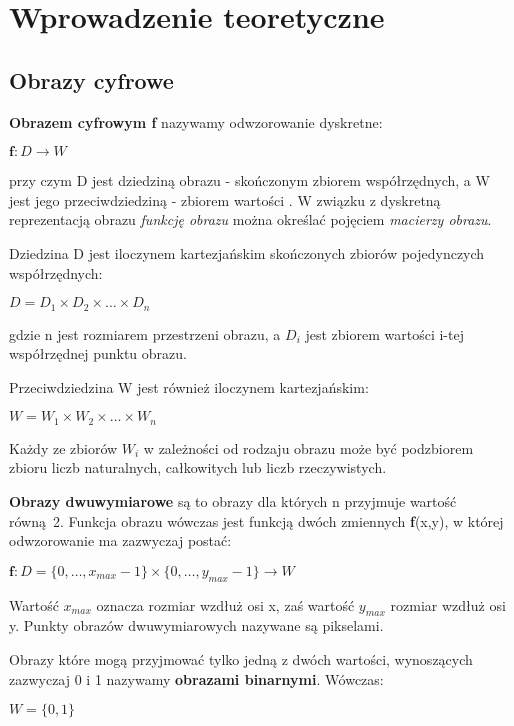 \documentclass[a4paper,12pt,twoside,openany]{report}
\begin{document}
\chapter{Wprowadzenie teoretyczne}
\section{Obrazy cyfrowe}
\textbf{Obrazem cyfrowym f} nazywamy odwzorowanie dyskretne: 
\begin{center}
	$ \textbf{f} \colon D \to W $ 
\end{center}
przy czym D jest dziedziną obrazu - skończonym zbiorem współrzędnych, a W jest jego przeciwdziedziną - zbiorem wartości \cite{Iwanowski}. W związku z dyskretną reprezentacją obrazu \textit{funkcję obrazu} można określać pojęciem \textit{macierzy obrazu}.

Dziedzina D jest iloczynem kartezjańskim skończonych zbiorów pojedynczych współrzędnych:
\begin{center}
	$ D = D_{1} \times D_{2}  \times \ldots  \times D_{n} $
\end{center}
gdzie n jest rozmiarem przestrzeni obrazu, a $ D_{i} $ jest zbiorem wartości i-tej współrzędnej punktu obrazu. 

Przeciwdziedzina W jest również iloczynem kartezjańskim:
\begin{center}
	$ W = W_{1} \times W_{2}  \times \ldots  \times W_{n} $
\end{center}

Każdy ze zbiorów $ W_{i} $ w zależności od rodzaju obrazu może być podzbiorem zbioru liczb naturalnych, całkowitych lub liczb rzeczywistych.

\textbf{Obrazy dwuwymiarowe} są to obrazy dla których n przyjmuje wartość równą~2. Funkcja obrazu wówczas jest funkcją dwóch zmiennych \textbf{f}(x,y), w której odwzorowanie ma zazwyczaj postać:
\begin{center}
	$ \textbf{f} \colon D = \{0, \ldots, x_{max}-1\} \times \{0, \ldots, y_{max}-1\} \to W $ 
\end{center}

Wartość $ x_{max} $ oznacza rozmiar wzdłuż osi x, zaś wartość $ y_{max} $ rozmiar wzdłuż osi y. Punkty obrazów dwuwymiarowych nazywane są pikselami.

Obrazy które mogą przyjmować tylko jedną z dwóch wartości, wynoszących zazwyczaj 0 i 1 nazywamy \textbf{obrazami binarnymi}. Wówczas:
\begin{center}
	$ W = \{0,1\} $ 
\end{center}
\end{document}
